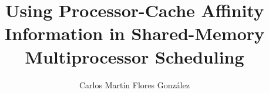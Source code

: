 \documentclass[10pt,acmlarge]{acmart}
\begin{document}
\title{Using Processor-Cache Affinity Information in Shared-Memory Multiprocessor Scheduling} 
\author{Carlos Martín Flores González}


%
%
%
%


\maketitle



\end{document}
